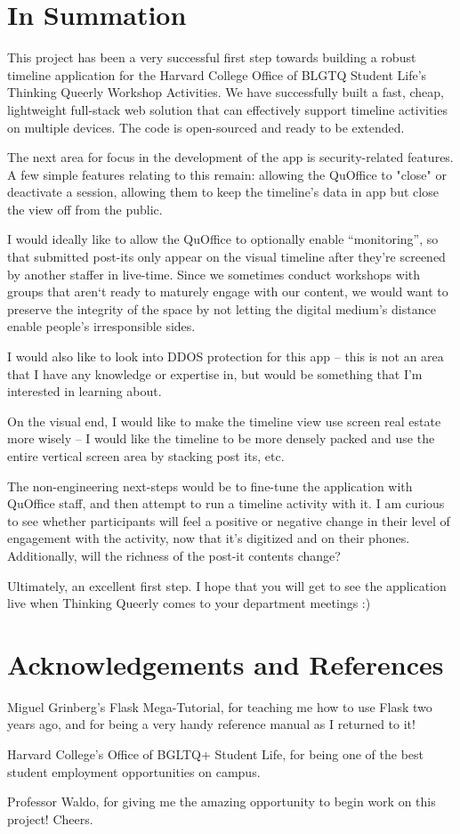 \documentclass[12pt] {article}
\begin{document}
\section{In Summation}

This project has been a very successful first step towards building a robust timeline application for the Harvard College Office of BLGTQ Student Life's Thinking Queerly Workshop Activities. We have successfully built a fast, cheap, lightweight full-stack web solution that can effectively support timeline activities on multiple devices. The code is open-sourced and ready to be extended.

The next area for focus in the development of the app is security-related features. A few simple features relating to this remain: allowing the QuOffice to "close" or deactivate a session, allowing them to keep the timeline's data in app but close the view off from the public.

I would ideally like to allow the QuOffice to optionally enable ``monitoring'', so that submitted post-its only appear on the visual timeline after they’re screened by another staffer in live-time. Since we sometimes conduct workshops with groups that aren`t ready to maturely engage with our content, we would want to preserve the integrity of the space by not letting the digital medium’s distance enable people’s irresponsible sides. 

I would also like to look into DDOS protection for this app -- this is not an area that I have any knowledge or expertise in, but would be something that I'm interested in learning about.

On the visual end, I would like to make the timeline view use screen real estate more wisely -- I would like the timeline to be more densely packed and use the entire vertical screen area by stacking post its, etc. 

The non-engineering next-steps would be to fine-tune the application with QuOffice staff, and then attempt to run a timeline activity with it. I am curious to see whether participants will feel a positive or negative change in their level of engagement with the activity, now that it's digitized and on their phones. Additionally, will the richness of the post-it contents change?

Ultimately, an excellent first step. I hope that you will get to see the application live when Thinking Queerly comes to your department meetings :) 

\section{Acknowledgements and References}

Miguel Grinberg's Flask Mega-Tutorial, for teaching me how to use Flask two years ago, and for being a very handy reference manual as I returned to it!

Harvard College's Office of BGLTQ+ Student Life, for being one of the best student employment opportunities on campus.

Professor Waldo, for giving me the amazing opportunity to begin work on this project! Cheers.

\pagebreak
\end{document}
